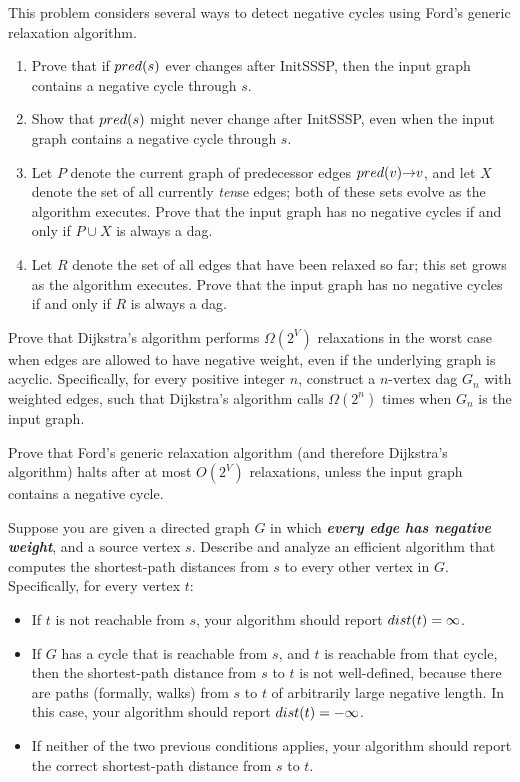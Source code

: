 \begin{exercises}
\item This problem considers several ways to detect negative cycles using Ford’s generic relaxation algorithm.
\begin{enumerate}
\item Prove that if $pred(s)$ ever changes after InitSSSP, then the input graph contains a negative cycle through $s$.
\item Show that $pred(s)$ might never change after InitSSSP, even when the input graph contains a negative cycle through $s$.
\item Let $P$ denote the current graph of predecessor edges $pred(v)\mathord{\rightarrow}v$, and let $X$ denote the set of all currently \textit{ten}se edges; both of these sets evolve as the algorithm executes.
Prove that the input graph has no negative cycles if and only if $P \cup X$ is always a dag.
\item Let $R$ denote the set of all edges that have been relaxed so far; this set grows as the algorithm executes.
Prove that the input graph has no negative cycles if and only if $R$ is always a dag.
\end{enumerate}

\item {} Prove that Dijkstra’s algorithm performs $\Omega(2^V)$ relaxations in the worst case when edges are allowed to have negative weight, even if the underlying graph is acyclic.
Specifically, for every positive integer $n$, construct a $n$-vertex dag $G_n$ with weighted edges, such that Dijkstra’s algorithm calls  $\Omega(2^n)$ times when $G_n$ is the input graph.

\item {} Prove that Ford’s generic relaxation algorithm (and therefore Dijkstra’s algorithm) halts after at most $O(2^V)$ relaxations, unless the input graph contains a negative cycle.

\item Suppose you are given a directed graph $G$ in which \textbf{\textit{every edge has negative weight}}, and a source vertex $s$.
Describe and analyze an efficient algorithm that computes the shortest-path distances from $s$ to every other vertex in $G$.
Specifically, for every vertex $t$:
\begin{itemize}
\item If $t$ is not reachable from $s$, your algorithm should report $dist(t) = \infty$.
\item If $G$ has a cycle that is reachable from $s$, and $t$ is reachable from that cycle, then the shortest-path distance from $s$ to $t$ is not well-defined, because there are paths (formally, walks) from $s$ to $t$ of arbitrarily large negative length.
In this case, your algorithm should report $dist(t) = -\infty$.
\item If neither of the two previous conditions applies, your algorithm should report the correct shortest-path distance from $s$ to $t$.
\end{itemize}


\end{exercises}
